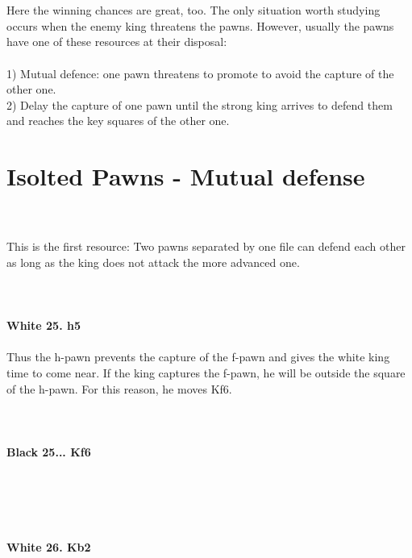 \documentclass{article}
\begin{document}

\\
\\
Here the winning chances are great, too. The only situation worth studying occurs when the enemy king threatens the pawns. However, usually the pawns have one of these resources at their disposal:\\\\1) Mutual defence: one pawn threatens to promote to avoid the capture of the other one.\\2) Delay the capture of one pawn until the strong king arrives to defend them and reaches the key squares of the other one.\section{ Isolted Pawns - Mutual defense}

\\
\\
This is the first resource: Two pawns separated by one file can defend each other as long as the king does not attack the more advanced one.\\
\\

\\
\\
\textbf{White 25. h5}\\
\\
Thus the h-pawn prevents the capture of the f-pawn and gives the white king time to come near. If the king captures the f-pawn, he will be outside the square of the h-pawn. For this reason, he moves Kf6.\\
\\

\\
\\
\textbf{Black 25... Kf6}\\
\\
\\
\\

\\
\\
\textbf{White 26. Kb2}\\
\\
\\
\\
\end{document}
